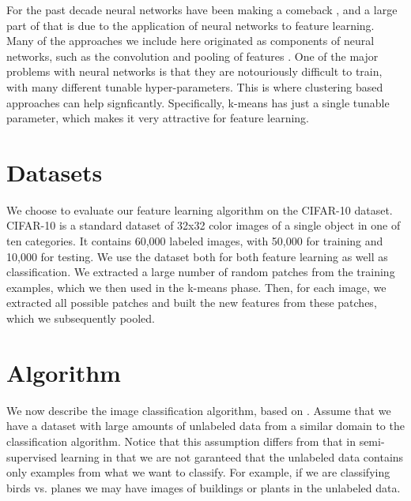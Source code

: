\documentclass{article} %
\begin{document}
For the past decade neural networks have been making a comeback \cite{Hinton:2006:FLA:1161603.1161605}, and a large part of that is due to the application of neural networks to feature learning. Many of the approaches we include here originated as components of neural networks, such as the convolution and pooling of features \cite{Le10tiledconvolutional} \cite{NIPS2012_4824}. One of the major problems with neural networks is that they are notouriously difficult to train, with many different tunable hyper-parameters. This is where clustering based approaches can help signficantly. Specifically, k-means has just a single tunable parameter, which makes it very attractive for feature learning.

\section{Datasets}

We choose to evaluate our feature learning algorithm on the CIFAR-10 dataset. CIFAR-10 is a standard dataset of 32x32 color images of a single object in one of ten categories. It contains 60,000 labeled images, with 50,000 for training and 10,000 for testing. We use the dataset both for both feature learning as well as classification. We extracted a large number of random patches from the training examples, which we then used in the k-means phase. Then, for each image, we extracted all possible patches and built the new features from these patches, which we subsequently pooled.

\section{Algorithm}

We now describe the image classification algorithm, based on \cite{coates11}. Assume that we have a dataset with large amounts of unlabeled data from a similar domain to the classification algorithm. Notice that this assumption differs from that in semi-supervised learning in that we are not garanteed that the unlabeled data contains only examples from what we want to classify. For example, if we are classifying birds vs. planes we may have images of buildings or plants in the unlabeled data.
\end{document}
